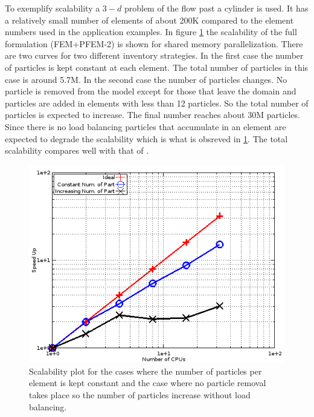 To exemplify scalability a $3-d$ problem of the flow past a cylinder is used. It has a relatively small number of elements of about 200K compared to the element numbers used in the application examples. 
In figure \ref{fig:scalab} the scalability of the full formulation (FEM+PFEM-2) is shown for shared memory parallelization. There are two curves for two different inventory strategies. In the first case the number of particles is kept constant at each element. The total number of particles in this case is around 5.7M. In the second case the number of particles changes. No particle is removed from the model except for those that leave the domain and particles are added in elements with less than 12 particles. So the total number of particles is expected to increase. The final number reaches about 30M particles. Since there is no load balancing particles that accumulate in an element are expected to degrade the scalability which is what is obsreved in \ref{fig:scalab}. The total scalability compares well with that of \cite{gimenez:parallel}.

\begin{figure}[htp] 
\centering 
\includegraphics[scale=.6]{./imgs/scalability1.png}
\caption{Scalability plot for the cases where the number of particles per element is kept constant and the case where no particle removal takes place so the number of particles increase without load balancing.}
\label{fig:scalab}
\end{figure}


 
